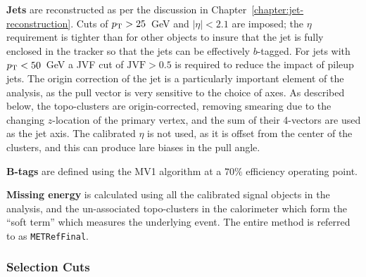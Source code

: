 	\textbf{Jets} are reconstructed as per the discussion in Chapter~\ref{chapter:jet-reconstruction}. Cuts of $p_{\text{T}} > 25$~GeV and $|\eta| < 2.1$ are imposed; the $\eta$ requirement is tighter than for other objects to insure that the jet is fully enclosed in the tracker so that the jets can be effectively $b$-tagged. For jets with $p_{\text{T}} < 50$~GeV a JVF cut of $\mathrm{JVF} > 0.5$ is required to reduce the impact of pileup jets. The origin correction of the jet is a particularly important element of the analysis, as the pull vector is very sensitive to the choice of axes. As described below, the topo-clusters are origin-corrected, removing smearing due to the changing $z$-location of the primary vertex, and the sum of their 4-vectors are used as the jet axis. The calibrated $\eta$ is not used, as it is offset from the center of the clusters, and this can produce lare biases in the pull angle.

	\textbf{B-tags} are defined using the MV1 algorithm at a $70\%$ efficiency operating point.

	\textbf{Missing energy} is calculated using all the calibrated signal objects in the analysis, and the un-associated topo-clusters in the calorimeter which form the ``soft term'' which measures the underlying event. The entire method is referred to as \texttt{METRefFinal}.


	\subsubsection{Selection Cuts}

